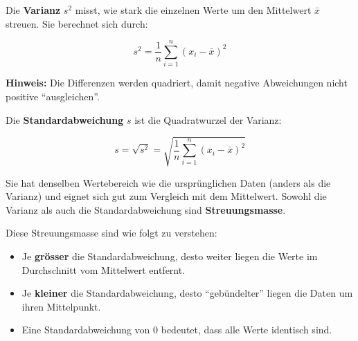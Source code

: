 \begin{lpu}
\begin{theorie}
Die \textbf{Varianz} $s^2$ misst, wie stark die einzelnen Werte um den Mittelwert $\bar{x}$ streuen. Sie berechnet sich durch:

\[
s^2 = \frac{1}{n} \sum_{i=1}^{n} (x_i - \bar{x})^2
\]

\textbf{Hinweis:} Die Differenzen werden quadriert, damit negative Abweichungen nicht positive ``ausgleichen''.

\vspace{0.5em}
Die \textbf{Standardabweichung} $s$ ist die Quadratwurzel der Varianz:

\[
s = \sqrt{s^2} = \sqrt{ \frac{1}{n} \sum_{i=1}^{n} (x_i - \bar{x})^2 }
\]

Sie hat denselben Wertebereich wie die ursprünglichen Daten (anders als die Varianz) und eignet sich gut zum Vergleich mit dem Mittelwert. Sowohl die Varianz als auch die Standardabweichung sind \textbf{Streuungsmasse}.
\end{theorie}

Diese Streuungsmasse sind wie folgt zu verstehen:
\begin{itemize}
  \item Je \textbf{grösser} die Standardabweichung, desto weiter liegen die Werte im Durchschnitt vom Mittelwert entfernt.
  \item Je \textbf{kleiner} die Standardabweichung, desto ``gebündelter'' liegen die Daten um ihren Mittelpunkt.
  \item Eine Standardabweichung von $0$ bedeutet, dass alle Werte identisch sind.
\end{itemize}

\begin{figure}[h]
\centering
{}
\end{figure}
\end{lpu}
